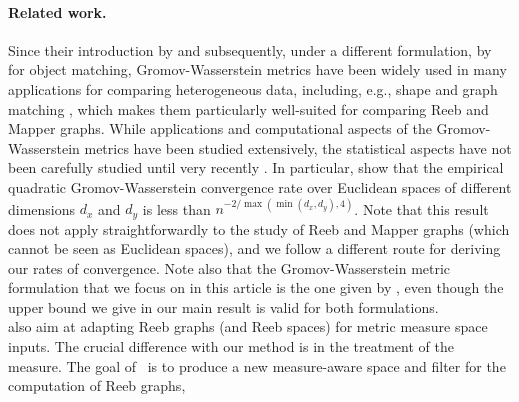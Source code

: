\documentclass[pdflatex,sn-mathphys-ay]{sn-jnl}%
\newcommand{\spa}{X}
\newcommand{\mes}{\mathrm{m}}
\newcommand{\R}{\mathbb{R}}
\newcommand{\change}[1]{\noindent #1}
\theoremstyle{thmstyleone}%
\begin{document}
\paragraph{Related work.} Since their introduction by \change{\citet{sturm2006geometry} and subsequently, under a different formulation, by \citet{memoli2007use}} for object matching, Gromov-Wasserstein metrics have been widely used in many applications for comparing 
heterogeneous data, including, e.g., shape and graph matching \citep{memoli2009spectral,xu2019gromov,koehl2023computing}, which makes them particularly well-suited for comparing %
Reeb and Mapper graphs. %
While applications and computational aspects of the Gromov-Wasserstein metrics have been studied extensively, the statistical aspects have not been carefully studied until very recently \citep{han2023covariance,zhang2024gromov}. %
In particular, \citet{zhang2024gromov} show that the empirical quadratic Gromov-Wasserstein convergence rate over Euclidean spaces of different dimensions $d_x$ and $d_y$ is less than $n^{-2/ \max(\min(d_x,d_y),4)}$. Note that this result does not apply straightforwardly to the study of Reeb and Mapper graphs (which cannot be seen as Euclidean spaces), %
and we follow a different route for deriving our rates of convergence. \change{Note also that the Gromov-Wasserstein metric formulation that we focus on in this article is the one given by \citet{sturm2006geometry}, even though the upper bound we give in our main result is valid for both formulations.}\\%
\citet{wangMeasureTheoreticReebGraphs2024} also aim at adapting Reeb graphs (and Reeb spaces) for metric measure space inputs. The crucial difference with our method is in the treatment of the measure. The goal of~\citet{wangMeasureTheoreticReebGraphs2024} is to 
produce a new measure-aware space %
and filter %
for the computation of Reeb graphs,
\end{document}
